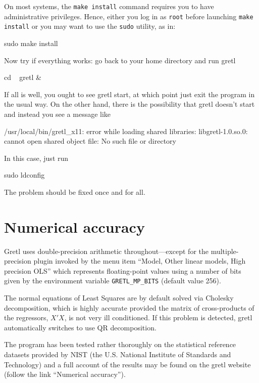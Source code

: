 On most systems, the \texttt{make install} command requires you to
have administrative privileges.  Hence, either you log in as
\texttt{root} before launching \texttt{make install} or you may want
to use the \texttt{sudo} utility, as in:
\begin{code}
sudo make install
\end{code}

Now try if everything works: go back to your home directory and run gretl
\begin{code}
cd ~
gretl &
\end{code}

If all is well, you ought to see gretl start, at which point just exit
the program in the usual way. On the other hand, there is the
possibility that gretl doesn't start and instead you see a message
like

\begin{code}
   /usr/local/bin/gretl_x11: error while loading shared libraries:
   libgretl-1.0.so.0: cannot open shared object file: No such file or directory
\end{code}

In this case, just run
\begin{code}
  sudo ldconfig
\end{code}
The problem should be fixed once and for all.

\chapter{Numerical accuracy}
\label{app-accuracy}

Gretl uses double-precision arithmetic throughout---except for
the multiple-precision plugin invoked by the menu item ``Model, Other
linear models, High precision OLS'' which represents floating-point
values using a number of bits given by the environment variable
\verb+GRETL_MP_BITS+ (default value 256).  

The normal equations of Least Squares are by default solved via
Cholesky decomposition, which is highly accurate provided the matrix
of cross-products of the regressors, $X'X$, is not very ill
conditioned.  If this problem is detected, gretl automatically
switches to use QR decomposition.

The program has been tested rather thoroughly on the statistical
reference datasets provided by NIST (the U.S.  National Institute of
Standards and Technology) and a full account of the results may be
found on the gretl website (follow the link ``Numerical accuracy'').

